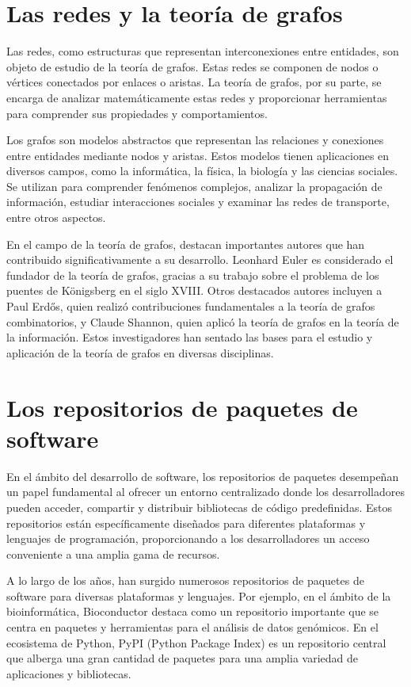 
\section{Las redes y la teoría de grafos}

Las redes, como estructuras que representan interconexiones entre entidades, son objeto de estudio de la teoría de grafos. Estas redes se componen de nodos o vértices conectados por enlaces o aristas. La teoría de grafos, por su parte, se encarga de analizar matemáticamente estas redes y proporcionar herramientas para comprender sus propiedades y comportamientos.

Los grafos son modelos abstractos que representan las relaciones y conexiones entre entidades mediante nodos y aristas. Estos modelos tienen aplicaciones en diversos campos, como la informática, la física, la biología y las ciencias sociales. Se utilizan para comprender fenómenos complejos, analizar la propagación de información, estudiar interacciones sociales y examinar las redes de transporte, entre otros aspectos.

En el campo de la teoría de grafos, destacan importantes autores que han contribuido significativamente a su desarrollo. Leonhard Euler es considerado el fundador de la teoría de grafos, gracias a su trabajo sobre el problema de los puentes de Königsberg en el siglo XVIII. Otros destacados autores incluyen a Paul Erdős, quien realizó contribuciones fundamentales a la teoría de grafos combinatorios, y Claude Shannon, quien aplicó la teoría de grafos en la teoría de la información. Estos investigadores han sentado las bases para el estudio y aplicación de la teoría de grafos en diversas disciplinas.

\section{Los repositorios de paquetes de software}

En el ámbito del desarrollo de software, los repositorios de paquetes desempeñan un papel fundamental al ofrecer un entorno centralizado donde los desarrolladores pueden acceder, compartir y distribuir bibliotecas de código predefinidas. Estos repositorios están específicamente diseñados para diferentes plataformas y lenguajes de programación, proporcionando a los desarrolladores un acceso conveniente a una amplia gama de recursos.

A lo largo de los años, han surgido numerosos repositorios de paquetes de software para diversas plataformas y lenguajes. Por ejemplo, en el ámbito de la bioinformática, Bioconductor destaca como un repositorio importante que se centra en paquetes y herramientas para el análisis de datos genómicos. En el ecosistema de Python, PyPI (Python Package Index) es un repositorio central que alberga una gran cantidad de paquetes para una amplia variedad de aplicaciones y bibliotecas.

